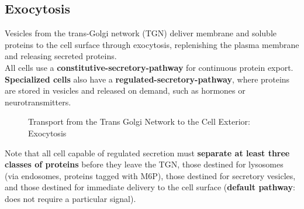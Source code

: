 \documentclass[../main.tex]{subfiles}
\begin{document}
\subsection{Exocytosis}
Vesicles from the trans-Golgi network (TGN) deliver membrane and soluble proteins to the cell surface through exocytosis, replenishing the plasma membrane and releasing secreted proteins.\\
\indent All cells use a \textbf{\gls{constitutive-secretory-pathway}} for continuous protein export. \textbf{Specialized cells} also have a \textbf{\gls{regulated-secretory-pathway}}, where proteins are stored in vesicles and released on demand, such as hormones or neurotransmitters. 
\begin{figure}[H]
	\centering
	\caption{Transport from the Trans Golgi Network to the Cell Exterior: Exocytosis}
\end{figure}
Note that all cell capable of regulated secretion must \textbf{separate at least three classes of proteins} before they leave the TGN, those destined for lysosomes (via endosomes, proteins tagged with M6P), those destined for secretory vesicles, and those destined for immediate delivery to the cell surface (\textbf{default pathway}: does not require a particular signal). \\
\end{document}
